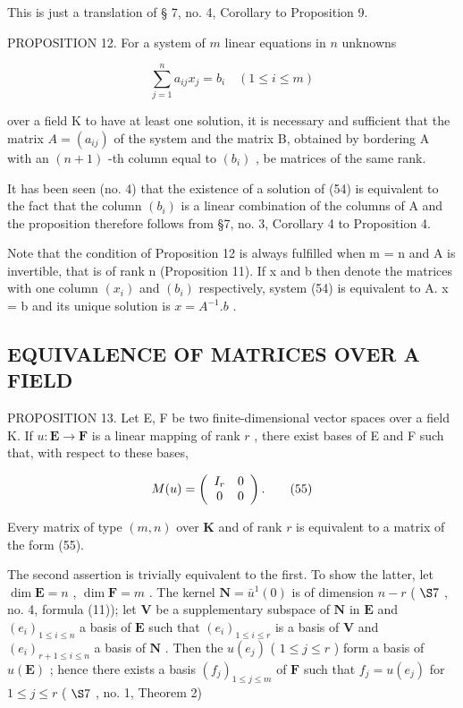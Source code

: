 This is just a translation of § 7, no. 4, Corollary to Proposition 9.

PROPOSITION 12. For a system of \(m\) linear equations in \(n\) unknowns

\[
\sum_ {j = 1} ^ {n} a _ {i j} x _ {j} = b _ {i} \quad (1 \leqslant i \leqslant m)\tag{54}
\]

over a field K to have at least one solution, it is necessary and sufficient that the matrix \(A = (a_{ij})\) of the system and the matrix B, obtained by bordering A with an \((n + 1)\) -th column equal to \((b_{i})\) , be matrices of the same rank.

It has been seen (no. 4) that the existence of a solution of (54) is equivalent to the fact that the column \((b_{i})\) is a linear combination of the columns of A and the proposition therefore follows from §7, no. 3, Corollary 4 to Proposition 4.

Note that the condition of Proposition 12 is always fulfilled when m = n and A is invertible, that is of rank n (Proposition 11). If x and b then denote the matrices with one column \((x_{i})\) and \((b_{i})\) respectively, system (54) is equivalent to A. x = b and its unique solution is \(x = A^{-1}.b\) .

\subsection{EQUIVALENCE OF MATRICES OVER A FIELD}

PROPOSITION 13. Let E, F be two finite-dimensional vector spaces over a field K. If \(u: \mathbf{E} \to \mathbf{F}\) is a linear mapping of rank \(r\) , there exist bases of E and F such that, with respect to these bases,

\[
M (u) = \left( \begin{array}{c c} I _ {r} & 0 \\ 0 & 0 \end{array} \right).\tag{55}
\]

Every matrix of type \((m, n)\) over \(\mathbf{K}\) and of rank \(r\) is equivalent to a matrix of the form (55).

The second assertion is trivially equivalent to the first. To show the latter, let \(\dim \mathbf{E} = n\) , \(\dim \mathbf{F} = m\) . The kernel \(\mathbf{N} = \bar{u}^{1}(0)\) is of dimension \(n - r\) ( \(\S 7\) , no. 4, formula (11)); let \(\mathbf{V}\) be a supplementary subspace of \(\mathbf{N}\) in \(\mathbf{E}\) and \((e_i)_{1 \leqslant i \leqslant n}\) a basis of \(\mathbf{E}\) such that \((e_i)_{1 \leqslant i \leqslant r}\) is a basis of \(\mathbf{V}\) and \((e_i)_{r + 1 \leqslant i \leqslant n}\) a basis of \(\mathbf{N}\) . Then the \(u(e_j)\) ( \(1 \leqslant j \leqslant r\) ) form a basis of \(u(\mathbf{E})\) ; hence there exists a basis \((f_j)_{1 \leqslant j \leqslant m}\) of \(\mathbf{F}\) such that \(f_j = u(e_j)\) for \(1 \leqslant j \leqslant r\) ( \(\S 7\) , no. 1, Theorem 2)

